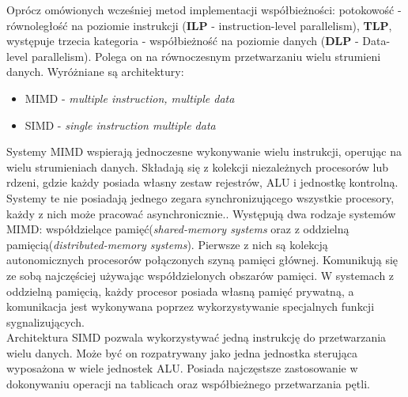 \documentclass[document.tex]{subfiles}
\begin{document}
\indent Oprócz omówionych wcześniej metod implementacji współbieżności: potokowość - równoległość na poziomie instrukcji
(\textbf{ILP} - instruction-level parallelism), \textbf{TLP},
występuje trzecia kategoria - współbieżność na poziomie danych
(\textbf{DLP} - Data-level parallelism). Polega on na równoczesnym przetwarzaniu wielu strumieni danych.
Wyróżniane są architektury:
\begin{itemize}
\item MIMD - \textit{multiple instruction, multiple data} 
\item SIMD - \textit{single instruction multiple data}
\end{itemize}
\indent Systemy MIMD wspierają jednoczesne wykonywanie wielu instrukcji, operując na wielu strumieniach danych. Składają się z kolekcji niezależnych procesorów lub rdzeni, gdzie każdy posiada własny zestaw rejestrów, ALU i jednostkę kontrolną. Systemy te nie posiadają jednego zegara synchronizującego wszystkie procesory, każdy z nich może pracować asynchronicznie.\cite{openmp_pacheco}\cite{OS_Stallings}.
Występują dwa rodzaje systemów MIMD: współdzielące pamięć(\textit{shared-memory systems} oraz
z oddzielną pamięcią(\textit{distributed-memory systems}).
Pierwsze z nich są kolekcją autonomicznych procesorów połączonych szyną pamięci głównej. Komunikują się ze sobą najczęściej używając współdzielonych obszarów pamięci.
W systemach z oddzielną pamięcią, każdy procesor posiada własną
pamięć prywatną, a komunikacja jest wykonywana poprzez wykorzystywanie specjalnych funkcji sygnalizujących.\cite{OS_Stallings}
\\
\indent Architektura SIMD pozwala wykorzystywać jedną instrukcję do przetwarzania wielu danych. Może być on rozpatrywany
jako jedna jednostka sterująca wyposażona w wiele jednostek ALU.
Posiada najczęstsze zastosowanie w dokonywaniu operacji na tablicach oraz współbieżnego przetwarzania pętli. 
\cite{Computer_Architecture_Patterson_Hennesy}\cite{openmp_pacheco}

\clearpage
\end{document}
